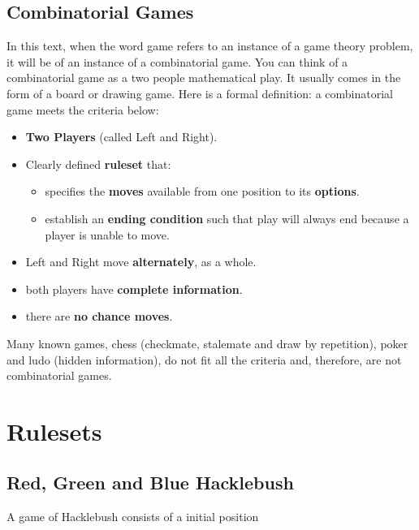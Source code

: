 \subsection{Combinatorial Games}
In this text, when the word game refers to an instance of a game theory problem, it will be of an instance of a combinatorial game.
You can think of a combinatorial game as a two people mathematical play. It usually comes in the form of a board or drawing game. Here is a formal definition: a combinatorial game meets the criteria below:
\begin{itemize}
    \item \textbf{Two Players} (called Left and Right).
    \item Clearly defined \textbf{ruleset} that:
    \begin{itemize}
        \item specifies the \textbf{moves} available from one position to its \textbf{options}.
        \item establish an \textbf{ending condition} such that play will always end because a player is unable to move.
    \end{itemize}
    \item Left and Right move \textbf{alternately}, as a whole.
    \item both players have \textbf{complete information}.
    \item there are \textbf{no chance moves}.
\end{itemize}
Many known games, chess (checkmate, stalemate and draw by repetition), poker and ludo (hidden information), do not fit all the criteria and, therefore, are not combinatorial games.

\section{Rulesets}
\subsection{Red, Green and Blue Hacklebush}
A game of Hacklebush consists of a initial position